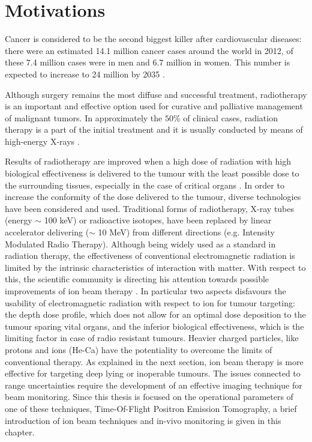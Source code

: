 \chapter{Motivations}

Cancer is considered to be the second biggest killer after cardiovascular diseases: there were an estimated 14.1 million cancer cases around the world in 2012, of these 7.4 million cases were in men and 6.7 million in women. This number is expected to increase to 24 million by 2035 \cite{Ferlay2012}.

Although surgery remains the most diffuse and successful treatment, radiotherapy is an important and effective option used for curative and palliative management of malignant tumors.
In approximately the $50\%$ of clinical cases, radiation therapy is a part of the initial treatment and it is usually conducted by means of high-energy X-rays \cite{Durante2010}.

Results of radiotherapy are improved when a high dose of radiation with high biological effectiveness is delivered to the tumour with the least possible dose to the surrounding tissues, especially in the case of critical organs \cite{Linz2011}.
In order to increase the conformity of the dose delivered to the tumour, diverse technologies have been considered and used.
Traditional forms of radiotherapy, X-ray tubes (energy $\sim$ 100 keV) or radioactive isotopes, have been replaced by linear accelerator delivering ($\sim$ 10 MeV) from different directions (e.g. Intensity Modulated Radio Therapy).
Although being widely used as a standard in radiation therapy, the effectiveness of conventional electromagnetic radiation is limited by the intrinsic characteristics of interaction with matter.
With respect to this, the scientific community is directing his attention towards possible improvements of ion beam therapy \cite{Amaldi2011}.
In particular two aspects disfavours the usability of electromagnetic radiation with respect to ion for tumour targeting: the depth dose profile, which does not allow for an optimal dose deposition to the tumour sparing vital organs,
and the inferior biological effectiveness, which is the limiting factor in case of radio resistant tumours.
Heavier charged particles, like protons and ions (He-Ca) have the potentiality to overcome the limits of conventional therapy. 
As explained in the next section, ion beam therapy is more effective for targeting deep lying  or inoperable tumours.
The issues connected to range uncertainties require the development of an effective imaging technique for beam monitoring. 
Since this thesis is focused on the operational parameters of one of these techniques, Time-Of-Flight Positron Emission Tomography, a brief introduction of ion beam techniques and in-vivo monitoring is given in this chapter.

